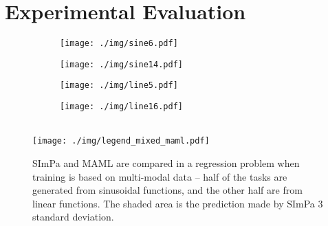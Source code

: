 \section{Experimental Evaluation}
\label{sec:experiments}
    \begin{figure*}[t]
		\centering
		\begin{subfigure}[t]{0.24\linewidth}
			\centering
			\texttt{[image: ./img/sine6.pdf]}
		\end{subfigure}
		\begin{subfigure}[t]{0.24\linewidth}
			\centering
			\texttt{[image: ./img/sine14.pdf]}
		\end{subfigure}
		\begin{subfigure}[t]{0.24\linewidth}
			\centering
			\texttt{[image: ./img/line5.pdf]}
		\end{subfigure}
		\begin{subfigure}[t]{0.24\linewidth}
			\centering
			\texttt{[image: ./img/line16.pdf]}
		\end{subfigure}
		\\
		\texttt{[image: ./img/legend\_mixed\_maml.pdf]}
		\caption{SImPa and MAML are compared in a regression problem when training is based on multi-modal data -- half of the tasks are generated from sinusoidal functions, and the other half are from linear functions. The shaded area is the prediction made by SImPa  3 standard deviation.}
		\label{fig:regression_visualisation}
	\end{figure*}
        
